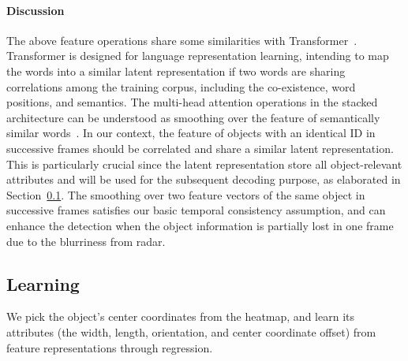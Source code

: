 \documentclass[10pt,twocolumn,letterpaper]{article}
\begin{document}
\vspace{-5mm}
\paragraph{Discussion} The above feature operations share some similarities with Transformer~\cite{vaswani2017attention}. Transformer is designed for language representation learning, intending to map the words into a similar latent representation if two words are sharing correlations among the training corpus, including the co-existence, word positions, and semantics. The multi-head attention operations in the stacked architecture can be understood as smoothing over the feature of semantically similar words~\cite{dong2021attention,gong2021improve,Li_2021_CVPR}. In our context, the feature of objects with an identical ID in successive frames should be correlated and share a similar latent representation. This is particularly crucial since the latent representation store all object-relevant attributes and will be used for the subsequent decoding purpose, as elaborated in Section~\ref{sec:learn}. The smoothing over two feature vectors of the same object in successive frames satisfies our basic temporal consistency assumption, and can enhance the detection when the object information is partially lost in one frame due to the blurriness from radar.



\subsection{Learning}\label{sec:learn}

We pick the object's center coordinates from the heatmap, and learn its attributes (\ie the width, length, orientation, and center coordinate offset) from feature representations through regression.

\vspace{-5mm}
\end{document}
